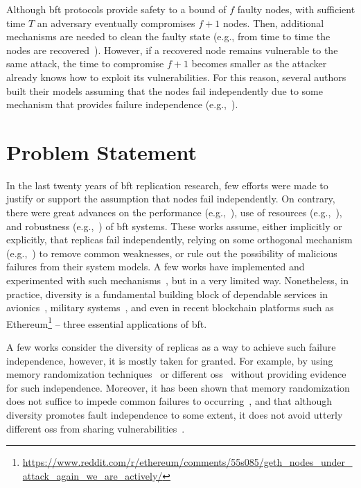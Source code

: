 Although \gls{bft} protocols provide safety to a bound of $f$ faulty nodes, with sufficient time $T$ an adversary eventually compromises $f+1$ nodes.
Then, additional mechanisms are needed to clean the faulty state (e.g., from time to time the nodes are recovered~\cite{Castro:2002}).
However, if a recovered node remains vulnerable to the same attack, the time to compromise $f+1$ becomes smaller as the attacker already knows how to exploit its vulnerabilities.
For this reason, several authors built their models assuming that the nodes fail independently due to some mechanism that provides failure independence (e.g.,~\cite{Castro:2002,Veronese:2013,Sousa:2010}).


\section{Problem Statement}
\label{sec:problemstatement}
In the last twenty years of \gls{bft} replication research, few efforts were made to justify or support the assumption that nodes fail independently. 
On contrary, there were great advances on the performance (e.g.,~\cite{Kotla:2010,Aublin:2015,Behl:2015}), use of resources (e.g.,~\cite{Yin:2003,Veronese:2013,Liu:2016,Behl:2017}), and robustness (e.g.,~\cite{Amir:2011,Bessani:2014,Clement:2009b}) of \gls{bft} systems.
These works assume, either implicitly or explicitly, that replicas fail independently, relying on some orthogonal mechanism (e.g.,~\cite{Roeder:2010,Avizienis:1995}) to remove common weaknesses, or rule out the possibility of malicious failures from their system models.
A few works have implemented and experimented with such mechanisms~\cite{Rodrigues:2001,Roeder:2010,Amir:2011}, but in a very limited way.
Nonetheless, in practice, diversity is a fundamental building block of dependable services in avionics~\cite{Yeh:2004}, military systems~\cite{rhimes}, and even in recent blockchain platforms such as Ethereum\footnote{\url{https://www.reddit.com/r/ethereum/comments/55s085/geth_nodes_under_attack_again_we_are_actively/}} -- three essential applications of \gls{bft}. 

A few works consider the diversity of replicas as a way to achieve such failure independence, however, it is mostly taken for granted.
For example, by using memory randomization techniques~\cite{Roeder:2010} or different \glspl{os}~\cite{Rodrigues:2001,Junqueira:2005} without providing evidence for such independence. 
Moreover, it has been shown that memory randomization does not suffice to impede common failures to occurring~\cite{Snow:2013,Bittau:2014}, and that although diversity promotes fault independence to some extent, it does not avoid utterly different \glspl{os} from sharing vulnerabilities~\cite{Garcia:2014}.

